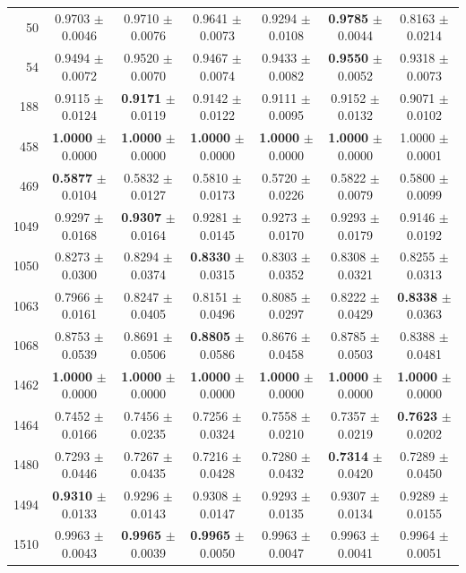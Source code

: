 \begin{table}[t]
\begin{tabular*}{\textwidth}{@{\extracolsep{\fill}}rcccccc@{}}
50 & 0.9703 $\pm$ 0.0046 & 0.9710 $\pm$ 0.0076 & 0.9641 $\pm$ 0.0073 & 0.9294 $\pm$ 0.0108 & \textbf{0.9785} $\pm$ 0.0044 & 0.8163 $\pm$ 0.0214 \\
54 & 0.9494 $\pm$ 0.0072 & 0.9520 $\pm$ 0.0070 & 0.9467 $\pm$ 0.0074 & 0.9433 $\pm$ 0.0082 & \textbf{0.9550} $\pm$ 0.0052 & 0.9318 $\pm$ 0.0073 \\
188 & 0.9115 $\pm$ 0.0124 & \textbf{0.9171} $\pm$ 0.0119 & 0.9142 $\pm$ 0.0122 & 0.9111 $\pm$ 0.0095 & 0.9152 $\pm$ 0.0132 & 0.9071 $\pm$ 0.0102 \\
458 & \textbf{1.0000} $\pm$ 0.0000 & \textbf{1.0000} $\pm$ 0.0000 & \textbf{1.0000} $\pm$ 0.0000 & \textbf{1.0000} $\pm$ 0.0000 & \textbf{1.0000} $\pm$ 0.0000 & 1.0000 $\pm$ 0.0001 \\
469 & \textbf{0.5877} $\pm$ 0.0104 & 0.5832 $\pm$ 0.0127 & 0.5810 $\pm$ 0.0173 & 0.5720 $\pm$ 0.0226 & 0.5822 $\pm$ 0.0079 & 0.5800 $\pm$ 0.0099 \\
1049 & 0.9297 $\pm$ 0.0168 & \textbf{0.9307} $\pm$ 0.0164 & 0.9281 $\pm$ 0.0145 & 0.9273 $\pm$ 0.0170 & 0.9293 $\pm$ 0.0179 & 0.9146 $\pm$ 0.0192 \\
1050 & 0.8273 $\pm$ 0.0300 & 0.8294 $\pm$ 0.0374 & \textbf{0.8330} $\pm$ 0.0315 & 0.8303 $\pm$ 0.0352 & 0.8308 $\pm$ 0.0321 & 0.8255 $\pm$ 0.0313 \\
1063 & 0.7966 $\pm$ 0.0161 & 0.8247 $\pm$ 0.0405 & 0.8151 $\pm$ 0.0496 & 0.8085 $\pm$ 0.0297 & 0.8222 $\pm$ 0.0429 & \textbf{0.8338} $\pm$ 0.0363 \\
1068 & 0.8753 $\pm$ 0.0539 & 0.8691 $\pm$ 0.0506 & \textbf{0.8805} $\pm$ 0.0586 & 0.8676 $\pm$ 0.0458 & 0.8785 $\pm$ 0.0503 & 0.8388 $\pm$ 0.0481 \\
1462 & \textbf{1.0000} $\pm$ 0.0000 & \textbf{1.0000} $\pm$ 0.0000 & \textbf{1.0000} $\pm$ 0.0000 & \textbf{1.0000} $\pm$ 0.0000 & \textbf{1.0000} $\pm$ 0.0000 & \textbf{1.0000} $\pm$ 0.0000 \\
1464 & 0.7452 $\pm$ 0.0166 & 0.7456 $\pm$ 0.0235 & 0.7256 $\pm$ 0.0324 & 0.7558 $\pm$ 0.0210 & 0.7357 $\pm$ 0.0219 & \textbf{0.7623} $\pm$ 0.0202 \\
1480 & 0.7293 $\pm$ 0.0446 & 0.7267 $\pm$ 0.0435 & 0.7216 $\pm$ 0.0428 & 0.7280 $\pm$ 0.0432 & \textbf{0.7314} $\pm$ 0.0420 & 0.7289 $\pm$ 0.0450 \\
1494 & \textbf{0.9310} $\pm$ 0.0133 & 0.9296 $\pm$ 0.0143 & 0.9308 $\pm$ 0.0147 & 0.9293 $\pm$ 0.0135 & 0.9307 $\pm$ 0.0134 & 0.9289 $\pm$ 0.0155 \\
1510 & 0.9963 $\pm$ 0.0043 & \textbf{0.9965} $\pm$ 0.0039 & \textbf{0.9965} $\pm$ 0.0050 & 0.9963 $\pm$ 0.0047 & 0.9963 $\pm$ 0.0041 & 0.9964 $\pm$ 0.0051 \\

\end{tabular*}
\end{table}
